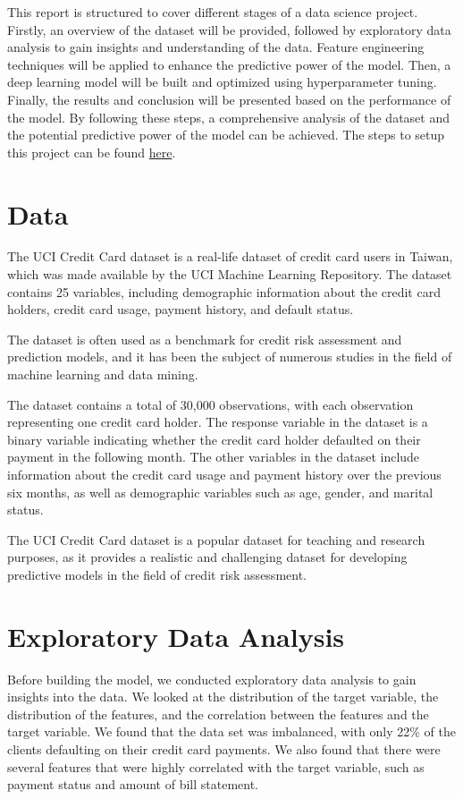 \documentclass[12pt,a4paper,oneside]{article}
\begin{document}
	This report is structured to cover different stages of a data science project. Firstly, an overview of the dataset will be provided, followed by exploratory data analysis to gain insights and understanding of the data. Feature engineering techniques will be applied to enhance the predictive power of the model. Then, a deep learning model will be built and optimized using hyperparameter tuning. Finally, the results and conclusion will be presented based on the performance of the model. By following these steps, a comprehensive analysis of the dataset and the potential predictive power of the model can be achieved. The steps to setup this project can be found \href{https://github.com/m-prth}{here}.
	
	
	\section{Data}
	The UCI Credit Card dataset is a real-life dataset of credit card users in Taiwan, which was made available by the UCI Machine Learning Repository. The dataset contains 25 variables, including demographic information about the credit card holders, credit card usage, payment history, and default status.
	
	The dataset is often used as a benchmark for credit risk assessment and prediction models, and it has been the subject of numerous studies in the field of machine learning and data mining.
	
	The dataset contains a total of 30,000 observations, with each observation representing one credit card holder. The response variable in the dataset is a binary variable indicating whether the credit card holder defaulted on their payment in the following month. The other variables in the dataset include information about the credit card usage and payment history over the previous six months, as well as demographic variables such as age, gender, and marital status.
	
	The UCI Credit Card dataset is a popular dataset for teaching and research purposes, as it provides a realistic and challenging dataset for developing predictive models in the field of credit risk assessment.

	
	\section{Exploratory Data Analysis}
	Before building the model, we conducted exploratory data analysis to gain insights into the data. We looked at the distribution of the target variable, the distribution of the features, and the correlation between the features and the target variable. We found that the data set was imbalanced, with only 22\% of the clients defaulting on their credit card payments. We also found that there were several features that were highly correlated with the target variable, such as payment status and amount of bill statement.
	
\end{document}

